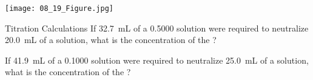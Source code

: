 \documentclass[notes=hide]{beamer}
\begin{document}
\begin{frame}
	\texttt{[image: 08\_19\_Figure.jpg]}
\end{frame}


\begin{frame}[t]{Titration Calculations}
	If \SI{32.7}{\milli\liter} of a \SI{0.5000}{\Molar}  solution
	were required to neutralize \SI{20.0}{\milli\liter} of a 
	solution, what is the concentration of the ?

\end{frame}

\begin{onyourown}
	If \SI{41.9}{\milli\liter} of a \SI{0.1000}{\Molar}  solution
	were required to neutralize \SI{25.0}{\milli\liter} of a 
	solution, what is the concentration of the ?
\end{onyourown}

\clearpage
\end{document}
